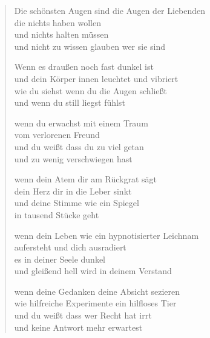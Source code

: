 
\cleartoverso


\begin{verse}

Die schönsten Augen sind die Augen der Liebenden\\
die nichts haben wollen\\
und nichts halten müssen\\
und nicht zu wissen glauben wer sie sind

Wenn es draußen noch fast dunkel ist\\
und dein Körper innen leuchtet und vibriert\\
wie du siehst wenn du die Augen schließt\\
und wenn du still liegst fühlst

wenn du erwachst mit einem Traum\\
vom verlorenen Freund\\
und du weißt dass du zu viel getan\\
und zu wenig verschwiegen hast

wenn dein Atem dir am Rückgrat sägt\\
dein Herz dir in die Leber sinkt\\
und deine Stimme wie ein Spiegel\\
in tausend Stücke geht

wenn dein Leben wie ein hypnotisierter Leichnam\\
aufersteht und dich ausradiert\\
es in deiner Seele dunkel\\
und gleißend hell wird in deinem Verstand

wenn deine Gedanken deine Absicht sezieren\\
wie hilfreiche Experimente ein hilfloses Tier\\
und du weißt dass wer Recht hat irrt\\
und keine Antwort mehr erwartest

\end{verse}

\clearpage


